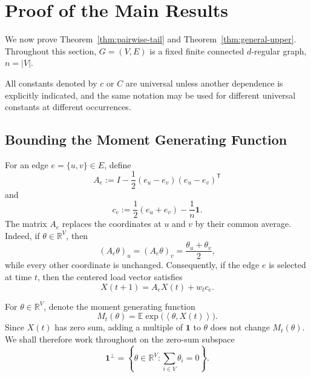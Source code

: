 \documentclass[11pt]{article}
\numberwithin{equation}{section}
\newcommand{\R}{\mathbb{R}}
\newcommand{\E}{\mathbb{E}}
\newcommand{\1}{\mathbf{1}}
\newcommand{\ip}[2]{\left\langle #1,#2\right\rangle}
\begin{document}


\section{Proof of the Main Results}
\label{sec:general-proof}

We now prove Theorem~\ref{thm:pairwise-tail} and Theorem~\ref{thm:general-upper}. Throughout this section, \(G=(V,E)\) is a fixed finite connected \(d\)-regular graph, \(n=|V|\).

\medskip

All constants denoted by \(c\) or \(C\) are universal unless another dependence is explicitly indicated, and the same notation may be used for different universal constants at different occurrences.


\subsection{Bounding the Moment Generating Function}

For an edge \(e=\{u,v\}\in E\), define
\[
A_e
:=
I-\frac12(e_u-e_v)(e_u-e_v)^{\mathsf T}
\]
and
\[
c_e
:=
\frac12(e_u+e_v)-\frac1n\1.
\]
The matrix \(A_e\) replaces the coordinates at \(u\) and \(v\) by their common average. Indeed, if \(\theta\in\R^V\), then
\[
(A_e\theta)_u=(A_e\theta)_v=\frac{\theta_u+\theta_v}{2},
\]
while every other coordinate is unchanged. Consequently, if the edge \(e\) is selected at time \(t\), then the centered load vector satisfies
\[
X(t+1)=A_eX(t)+w_tc_e.
\]

For \(\theta\in\R^V\), denote the moment generating function
\[
M_t(\theta)
=
\E\exp\bigl(\ip{\theta}{X(t)}\bigr).
\]
Since \(X(t)\) has zero sum, adding a multiple of \(\1\) to \(\theta\) does not change \(M_t(\theta)\). We shall therefore work throughout on the zero-sum subspace
\[
\1^\perp
=
\left\{
\theta\in\R^V:
\sum_{i\in V}\theta_i=0
\right\}.
\]
\end{document}
